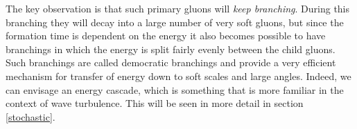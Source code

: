 \documentclass[a4paper,12pt]{article}
\numberwithin{equation}{section}
\begin{document}


The key observation is that such primary gluons will \emph{keep branching}. During this branching they will decay into a large number of very soft gluons, but since the formation time is dependent on the energy it also becomes possible to have branchings in which the energy is split fairly evenly between the child gluons. Such branchings are called democratic branchings and provide a very efficient mechanism for transfer of energy down to soft scales and large angles. Indeed, we can envisage an energy cascade, which is something that is more familiar in the context of wave turbulence. This will be seen in more detail in section \ref{stochastic}.
\end{document}
